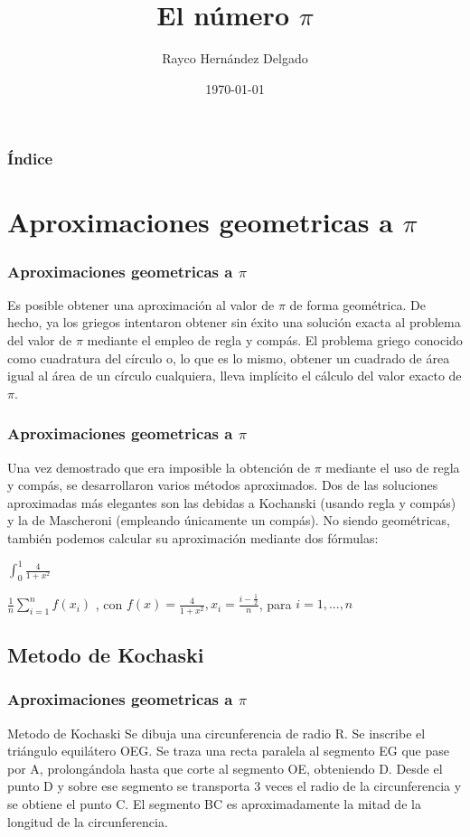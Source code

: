 \documentclass{beamer}
\title[\bf{El número $\pi$}]{El número $\pi$}
\author[Rayco Hernández Delgado]{Rayco Hernández Delgado}
\date[\today]{\today}
\begin{document}
\begin{frame}
\titlepage
\end{frame}

\begin{frame}
\frametitle{Índice}
\tableofcontents[pausesections]
\end{frame}


\section {Aproximaciones geometricas a $\pi$}
\begin{frame}
\frametitle{Aproximaciones geometricas a $\pi$}
Es posible obtener una aproximación al valor de $\pi$ de forma geométrica. De hecho, ya los griegos intentaron obtener sin éxito una solución exacta al problema del valor de $\pi$ mediante el empleo de regla y compás. El problema griego conocido como cuadratura del círculo o, lo que es lo mismo, obtener un cuadrado de área igual al área de un círculo cualquiera, lleva implícito el cálculo del valor exacto de $\pi$.
\end{frame}



\begin{frame}
\frametitle{Aproximaciones geometricas a $\pi$}
Una vez demostrado que era imposible la obtención de $\pi$ mediante el uso de regla y compás, se desarrollaron varios métodos aproximados. Dos de las soluciones aproximadas más elegantes son las debidas a Kochanski (usando regla y compás) y la de Mascheroni (empleando únicamente un compás).
No siendo geométricas, también podemos calcular su aproximación mediante dos fórmulas:

$\int_{0}^{1}\frac{4}{1+x^2}$

$\frac{1}{n} \sum_{i=1}^{n} f(x_i)$ , con  $f(x) = \frac{4}{1+x^2} , x_i = \frac{i-\frac{1}{2}}{n}$, para $i=1,...,n$

\end{frame}
\subsection {Metodo de Kochaski}
\begin{frame}
\frametitle{Aproximaciones geometricas a $\pi$}
\begin{block}{Metodo de Kochaski}
Se dibuja una circunferencia de radio R. Se inscribe el triángulo equilátero OEG. Se traza una recta paralela al segmento EG que pase por A, prolongándola hasta que corte al segmento OE, obteniendo D. Desde el punto D y sobre ese segmento se transporta 3 veces el radio de la circunferencia y se obtiene el punto C. El segmento BC es aproximadamente la mitad de la longitud de la circunferencia. \cite{Wpress}
\end{block}
\end{frame}
\end{document}
